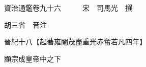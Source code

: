 










 


 
 


 

  
  
  
  
  





  
  
  
  
  
 
  

  

  
  
  



  

 
 

  
   




  

  
  


  　　資治通鑑卷九十六　　　宋　司馬光　撰

　　胡三省　音注

　　晉紀十八【起著雍閹茂盡重光赤奮若凡四年】

　　顯宗成皇帝中之下

